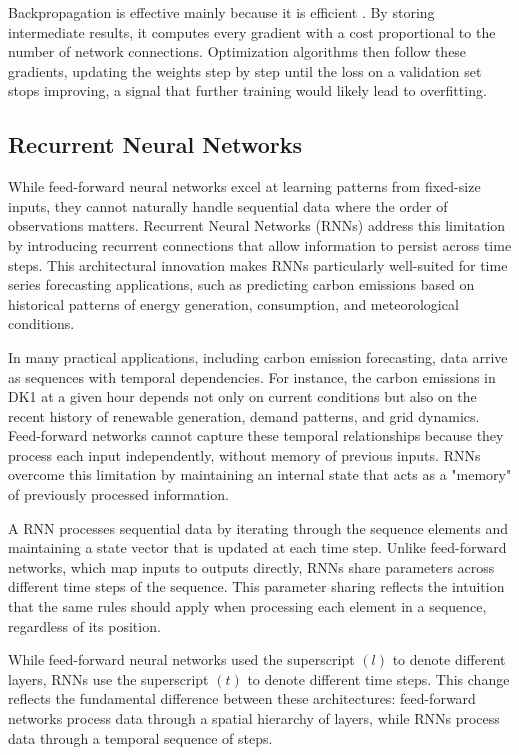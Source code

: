 Backpropagation is effective mainly because it is efficient \parencite{goodfellow2016}. By storing intermediate results, it computes every gradient with a cost proportional to the number of network connections. Optimization algorithms then follow these gradients, updating the weights step by step until the loss on a validation set stops improving, a signal that further training would likely lead to overfitting.

\subsection{Recurrent Neural Networks}

While feed-forward neural networks excel at learning patterns from fixed-size inputs, they cannot naturally handle sequential data where the order of observations matters. Recurrent Neural Networks (RNNs) address this limitation by introducing recurrent connections that allow information to persist across time steps. This architectural innovation makes RNNs particularly well-suited for time series forecasting applications, such as predicting carbon emissions based on historical patterns of energy generation, consumption, and meteorological conditions.

In many practical applications, including carbon emission forecasting, data arrive as sequences with temporal dependencies. For instance, the carbon emissions in DK1 at a given hour depends not only on current conditions but also on the recent history of renewable generation, demand patterns, and grid dynamics. Feed-forward networks cannot capture these temporal relationships because they process each input independently, without memory of previous inputs. RNNs overcome this limitation by maintaining an internal state that acts as a "memory" of previously processed information.

A RNN processes sequential data by iterating through the sequence elements and maintaining a state vector that is updated at each time step. Unlike feed-forward networks, which map inputs to outputs directly, RNNs share parameters across different time steps of the sequence. This parameter sharing reflects the intuition that the same rules should apply when processing each element in a sequence, regardless of its position.

While feed-forward neural networks used the superscript \((l)\) to denote different layers, RNNs use the superscript \((t)\) to denote different time steps. This change reflects the fundamental difference between these architectures: feed-forward networks process data through a spatial hierarchy of layers, while RNNs process data through a temporal sequence of steps.

